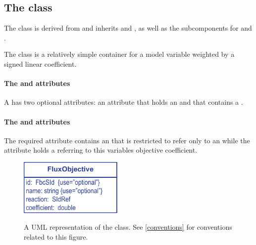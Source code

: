 \subsection{The \FBC {} class}
\label{fluxobjective-class}

The \FBC \FluxObjective class is derived from \SBML \SBase and inherits  and , as well as the subcomponents for \Annotation and \Notes.

The \FluxObjective class is a relatively simple container for a model variable weighted by a signed linear coefficient.

\paragraph{The  and  attributes}
A \FluxObjective has two optional attributes:  an attribute that holds an  and  that contains a .

\paragraph{The  and  attributes}
The required  attribute contains an  that is restricted to refer only to an \SBML \Reaction while the  attribute holds a  referring to this variables objective coefficient.

\begin{figure}[h]
  \centering
  \includegraphics[width=5cm]{images/fbc_uml_fobj.pdf}\\
  \caption{A UML representation of the \FBCPackage \FluxObjective class. See \ref{conventions} for conventions related to this figure.}
  \label{fig:fbc_uml_fobj}
\end{figure}


